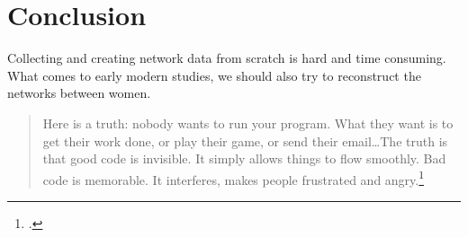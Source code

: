 \section{Conclusion}
Collecting and creating network data from scratch is hard and time consuming. 
What comes to early modern studies, we should also try to reconstruct the networks between women. 

\begin{quote}
	Here is a truth: nobody wants to run your program. What they want is to get their work done, or play their game, or send their email\ldots The truth is that good code is invisible. It simply allows things to flow smoothly. Bad code is memorable. It interferes, makes people frustrated and angry.\footcite[prefix p. XVI]{python}
\end{quote}


